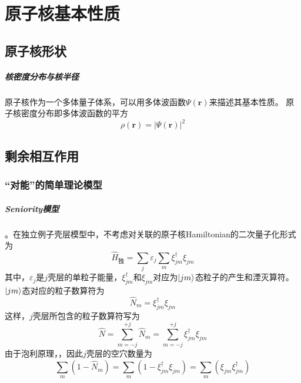 \chapter{原子核基本性质}

\section{原子核形状}
\paragraph*{核密度分布与核半径}
原子核作为一个多体量子体系，可以用多体波函数$\Psi(\bm{r})$来描述其基本性质。
原子核密度分布即多体波函数的平方
\begin{equation}
    \rho(\bm{r}) = | \Psi(\bm{r}) |^2   \label{eq:nucl.radius}
\end{equation}


\section{剩余相互作用}
\subsection{“对能”的简单理论模型}

\paragraph*{Seniority模型}
。在独立例子壳层模型中，不考虑对关联的原子核Hamiltonian的二次量子化形式为
\begin{equation}
    \hat{H}_{\text{独}}
        = \sum_{j} \varepsilon_j \sum_{m} \xi_{jm}^{\dagger} \xi_{jm}
    \label{eq:indep-hamil}
\end{equation}
其中，$\varepsilon_j$是$j$壳层的单粒子能量，$\xi_{jm}^{\dagger}$和$\xi_{jm}$对应为$\ket{jm}$态粒子的产生和湮灭算符。$\ket{jm}$态对应的粒子数算符为
\begin{equation}
    \hat{N}_{m} = \xi_{jm}^{\dagger} \xi_{jm}
\end{equation}
这样，$j$壳层所包含的粒子数算符写为
\begin{equation}
    \hat{N} = \sum_{m = -j}^{+j} \hat{N}_m
            = \sum_{m = -j}^{+j} \xi_{jm}^{\dagger} \xi_{jm}
\end{equation}
由于泡利原理，，因此$j$壳层的空穴数量为
\begin{equation}
    \sum_{m}(1 - \hat{N}_m) = \sum_{m}(1 -  \xi_{jm}^{\dagger} \xi_{jm} )
                    = \sum_{m}(\xi_{jm} \xi_{jm}^{\dagger} )
\end{equation}

